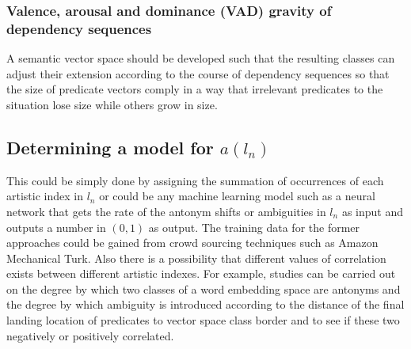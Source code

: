 \documentclass{article}
\begin{document}
	\subsubsection{Valence, arousal and dominance (VAD) gravity of dependency sequences} \label{sec:methodology-vad}
	A semantic vector space should be developed such that the resulting classes can adjust their extension according to the course of dependency sequences so that the size of predicate vectors comply in a way that irrelevant predicates to the situation lose size while others grow in size. 
	
	\subsection{Determining a model for $a(l_n)$}
	This could be simply done by assigning the summation of occurrences of each artistic index in $l_n$ or could be any machine learning model such as a neural network that gets the rate of the antonym shifts or ambiguities in $l_n$ as input and outputs a number in $(0,1)$ as output. The training data for the former approaches could be gained from crowd sourcing techniques such as Amazon Mechanical Turk. Also there is a possibility that different values of correlation exists between different artistic indexes. For example, studies can be carried out on the degree by which two classes of a word embedding space are antonyms and the degree by which ambiguity is introduced according to the distance of the final landing location of predicates to vector space class border and to see if these two negatively or positively correlated. 
\end{document}
